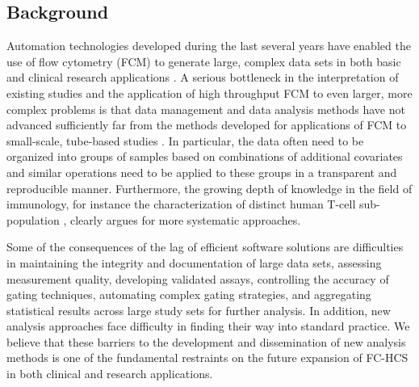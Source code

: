 \documentclass[10pt]{bmc_article}
\newenvironment{bmcformat}{\begin{raggedright}\baselineskip20pt\sloppy\setboolean{publ}{false}}{\end{raggedright}\baselineskip20pt\sloppy}
\begin{document}
\begin{bmcformat}
\section*{Background}
Automation technologies developed during the last several years have
enabled the use of flow cytometry (FCM) to generate large, complex
data sets in both basic and clinical research applications
\cite{brinkman2007hcf}. A serious bottleneck in the interpretation of
existing studies and the application of high throughput FCM to even
larger, more complex problems is that data management and data
analysis methods have not advanced sufficiently far from the methods
developed for applications of FCM to small-scale, tube-based studies
\cite{mahnke2007omi}. In particular, the data often need to be
organized into groups of samples based on combinations of additional
covariates and similar operations need to be applied to these groups
in a transparent and reproducible manner. Furthermore, the growing
depth of knowledge in the field of immunology, for instance the
characterization of distinct human T-cell sub-population \cite{Appay},
clearly argues for more systematic approaches.

Some of the consequences of the lag of efficient software solutions
are difficulties in maintaining the integrity and documentation of
large data sets, assessing measurement quality, developing validated
assays, controlling the accuracy of gating techniques, automating
complex gating strategies, and aggregating statistical results across
large study sets for further analysis. In addition, new analysis
approaches face difficulty in finding their way into standard
practice. We believe that these barriers to the development and
dissemination of new analysis methods is one of the fundamental
restraints on the future expansion of FC-HCS in both clinical and
research applications.


\end{bmcformat}
\end{document}
